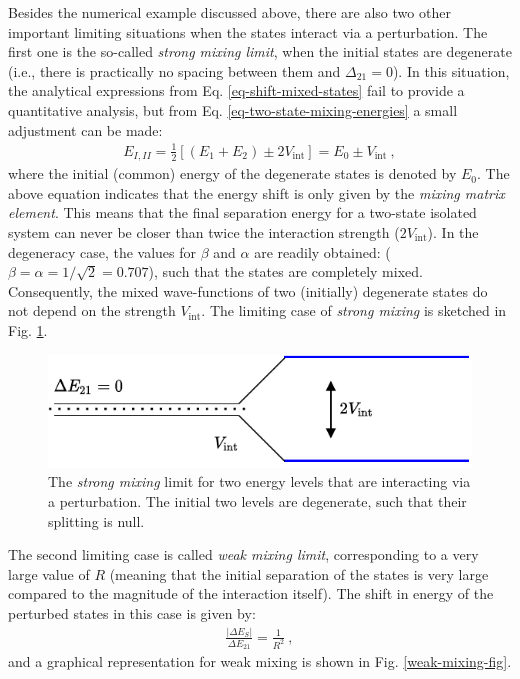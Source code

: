 Besides the numerical example discussed above, there are also two other important limiting situations when the states interact via a perturbation. The first one is the so-called \emph{strong mixing limit}, when the initial states are degenerate (i.e., there is practically no spacing between them and $\Delta_{21}=0$). In this situation, the analytical expressions from Eq. \eqref{eq-shift-mixed-states} fail to provide a quantitative analysis, but from Eq. \eqref{eq-two-state-mixing-energies} a small adjustment can be made:
\begin{align}
    E_{I,II}=\frac{1}{2}\left[(E_1+E_2)\pm2V_\text{int}\right]=E_0\pm V_\text{int}\ ,
\end{align}
where the initial (common) energy of the degenerate states is denoted by $E_0$. The above equation indicates that the energy shift is only given by the \emph{mixing matrix element}. This means that the final separation energy for a two-state isolated system can never be closer than twice the interaction strength ($2V_\text{int}$). In the degeneracy case, the values for $\beta$ and $\alpha$ are readily obtained: ($\beta=\alpha=1/\sqrt{2}=0.707$), such that the states are completely mixed. Consequently, the mixed wave-functions of two (initially) degenerate states do not depend on the strength $V_\text{int}$. The limiting case of \emph{strong mixing} is sketched in Fig. \ref{strong-mixing-fig}.
\begin{figure}
    \centering
    \includegraphics[scale=0.95]{Chapters/Figures/mixing_strong_coupling.pdf}
    \caption{The \emph{strong mixing} limit for two energy levels that are interacting via a perturbation. The initial two levels are degenerate, such that their splitting is null.}
    \label{strong-mixing-fig}
\end{figure}

The second limiting case is called \emph{weak mixing limit}, corresponding to a very large value of $R$ (meaning that the initial separation of the states is very large compared to the magnitude of the interaction itself). The shift in energy of the perturbed states in this case is given by:
\begin{align}
    \frac{|\Delta E_S|}{\Delta E_{21}}=\frac{1}{R^2}\ ,
\end{align}
and a graphical representation for weak mixing is shown in Fig. \ref{weak-mixing-fig}. 

